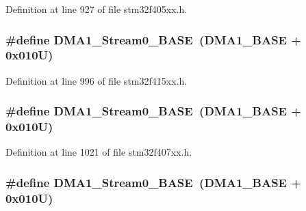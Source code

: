 Definition at line 927 of file stm32f405xx.\+h.

\subsubsection[{\texorpdfstring{D\+M\+A1\+\_\+\+Stream0\+\_\+\+B\+A\+SE}{DMA1_Stream0_BASE}}]{\setlength{\rightskip}{0pt plus 5cm}\#define D\+M\+A1\+\_\+\+Stream0\+\_\+\+B\+A\+SE~({\bf D\+M\+A1\+\_\+\+B\+A\+SE} + 0x010\+U)}\hypertarget{group___peripheral__registers__structures_ga0d3c52aa35dcc68f78b704dfde57ba95}{}\label{group___peripheral__registers__structures_ga0d3c52aa35dcc68f78b704dfde57ba95}


Definition at line 996 of file stm32f415xx.\+h.

\subsubsection[{\texorpdfstring{D\+M\+A1\+\_\+\+Stream0\+\_\+\+B\+A\+SE}{DMA1_Stream0_BASE}}]{\setlength{\rightskip}{0pt plus 5cm}\#define D\+M\+A1\+\_\+\+Stream0\+\_\+\+B\+A\+SE~({\bf D\+M\+A1\+\_\+\+B\+A\+SE} + 0x010\+U)}\hypertarget{group___peripheral__registers__structures_ga0d3c52aa35dcc68f78b704dfde57ba95}{}\label{group___peripheral__registers__structures_ga0d3c52aa35dcc68f78b704dfde57ba95}


Definition at line 1021 of file stm32f407xx.\+h.

\subsubsection[{\texorpdfstring{D\+M\+A1\+\_\+\+Stream0\+\_\+\+B\+A\+SE}{DMA1_Stream0_BASE}}]{\setlength{\rightskip}{0pt plus 5cm}\#define D\+M\+A1\+\_\+\+Stream0\+\_\+\+B\+A\+SE~({\bf D\+M\+A1\+\_\+\+B\+A\+SE} + 0x010\+U)}\hypertarget{group___peripheral__registers__structures_ga0d3c52aa35dcc68f78b704dfde57ba95}{}\label{group___peripheral__registers__structures_ga0d3c52aa35dcc68f78b704dfde57ba95}


